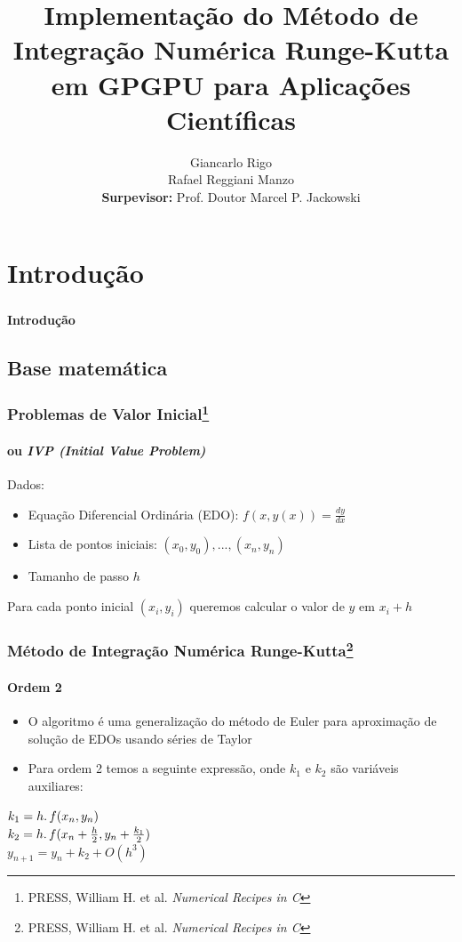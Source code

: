 \documentclass[brazil, 10pt]{beamer}
\title{Implementação do Método de Integração Numérica Runge-Kutta em GPGPU para Aplicações Científicas}
\author{Giancarlo Rigo\\
        Rafael Reggiani Manzo\\
        \textbf{Surpevisor:} Prof. Doutor Marcel P. Jackowski}
\begin{document}
\maketitle

\section{Introdução}
\begin{frame}
  \frametitle{}
  \framesubtitle{}
  \begin{Large}
  \begin{center}
  \textbf{Introdução}
  \end{center}
  \end{Large}
\end{frame}

\subsection{Base matemática}
\begin{frame}
  \frametitle{Problemas de Valor Inicial\footnote{PRESS, William H. et al. \textit{Numerical Recipes in C}}}
  \framesubtitle{ou \textit{IVP (Initial Value Problem)}}

  Dados:
  \begin{itemize}
    \item Equação Diferencial Ordinária (EDO): $f(x, y(x)) = \frac{dy}{dx} $
    \item Lista de pontos iniciais: $ (x_{0}, y_{0}),...,(x_{n},y_{n}) $
    \item Tamanho de passo $ h $
  \end{itemize}
   
  Para cada ponto inicial $ (x_{i}, y_{i}) $ queremos calcular o valor de $ y $ em $ x_{i} + h $ 
\end{frame}

\begin{frame}
  \frametitle{Método de Integração Numérica Runge-Kutta\footnote{PRESS, William H. et al. \textit{Numerical Recipes in C}}}
  \framesubtitle{Ordem 2}
  \begin{itemize}
    \item O algoritmo é uma generalização do método de Euler para aproximação de solução de EDOs usando séries de Taylor
    \item Para ordem 2 temos a seguinte expressão, onde $ k_{1} $ e $ k_{2} $ são variáveis auxiliares:
  \end{itemize}
 
  $ k_{1} = h\ldotp f(x_{n},y_{n}) $\\
  $ k_{2} = h\ldotp f(x_{n} + \frac{h}{2},y_{n} + \frac{k_{1}}{2}) $\\
  $ y_{n+1} = y_{n} + k_{2} + O(h^{3}) $ 
  
\end{frame}
\end{document}
